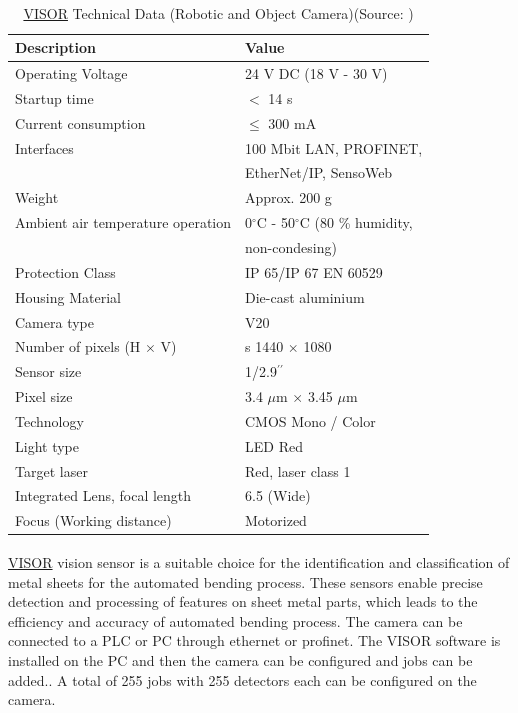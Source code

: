 \begin{table}[h!]
    \centering
    \small
    \renewcommand{\arraystretch}{1.2} %
    \begin{tabular}{ll}
        \textbf{Description} & \textbf{Value} \\ \hline
        Operating Voltage & 24 V DC (18 V - 30 V) \\
        Startup time & $<$ 14 s\\
        Current consumption & $\leq$ 300 mA \\
        Interfaces & 100 Mbit LAN, PROFINET,\\
        & EtherNet/IP, SensoWeb\\ 
        Weight & Approx. 200 g \\ 
        Ambient air temperature operation & 0$^\circ$C - 50$^\circ$C (80 \% humidity,\\
        & non-condesing) \\ 
        Protection Class & IP 65/IP 67 EN 60529\\
        Housing Material & Die-cast aluminium\\
        Camera type & V20 \\ 
        Number of pixels (H $\times$ V) &s 1440 $\times$ 1080\\
        Sensor size & 1/2.9$^{\prime\prime}$ \\ 
        Pixel size & 3.4 $\mu$m $\times$ 3.45 $\mu$m\\
        Technology & CMOS Mono / Color\\
        Light type & LED Red\\ 
        Target laser & Red, laser class 1\\ 
        Integrated Lens, focal length & 6.5 (Wide)\\
        Focus (Working distance) & Motorized \\ \hline
    \end{tabular}
    \caption{\hyperref[acro:VISOR]{VISOR}\textsuperscript{\textregistered} Technical Data (Robotic and Object Camera)(Source: \cite{visor_user_manual})}
\end{table}

\hyperref[acro:VISOR]{VISOR}\textsuperscript{\textregistered} vision sensor is a suitable choice for the identification and classification of metal sheets for the automated bending process. These sensors enable precise detection and processing of features on sheet metal parts, which leads to the efficiency and accuracy of automated bending process. The camera can be connected to a PLC or PC through ethernet or profinet. The VISOR software is installed on the PC and then the camera can be configured and jobs can be added.\cite{sensopart-software}. A total of 255 jobs with 255 detectors each can be configured on the camera.

